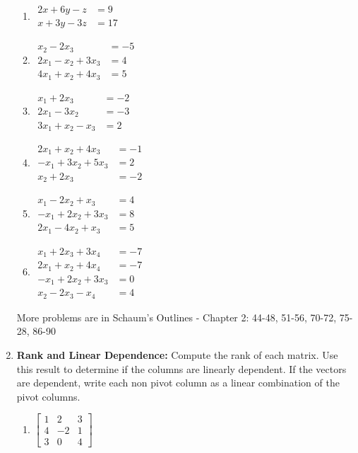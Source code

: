\begin{enumerate}
\begin{multicols}{3}
\begin{enumerate}
	\item 
$
\begin{array}{rl}
 2x+ 6y -z &= 9 \\
 x+ 3y -3z &= 17
\end{array}
$


	\item 
$
\begin{array}{rl}
  x_2 -2x_3 &= -5 \\
 2x_1 -x_2 + 3x_3 &= 4 \\
 4x_1 +x_2 + 4x_3 &= 5
\end{array}
$


	\item 
$
\begin{array}{rl}
 x_1 + 2x_3 &= -2 \\
 2x_1  -3x_2  &= -3 \\
 3x_1 +x_2 -x_3 &= 2
\end{array}
$


	\item 
$
\begin{array}{rl}
 2x_1 +x_2 + 4x_3 &= -1 \\
 -x_1 + 3x_2 + 5x_3 &= 2 \\
 x_2 + 2x_3 &= -2
\end{array}
$


	\item 
$
\begin{array}{rl}
 x_1 -2x_2 +x_3 &= 4 \\
 -x_1 + 2x_2 + 3x_3 &= 8 \\
 2x_1  -4x_2 +x_3 &= 5
\end{array}
$


	\item 
$
\begin{array}{rl}
 x_1 + 2x_3 + 3x_4 &= -7 \\
 2x_1 +x_2 + 4x_4 &= -7 \\
 -x_1 + 2x_2 + 3x_3  &= 0 \\
 x_2  -2x_3  -x_4 &= 4
\end{array}
$
\end{enumerate}
\end{multicols}

More problems are in Schaum's Outlines - 
Chapter 2:
44-48, 51-56, 70-72, 75-28, 86-90 






\item \textbf{Rank and Linear Dependence:} Compute the rank of each matrix. Use this result to determine if the columns are linearly dependent. If the vectors are dependent, write each non pivot column as a linear combination of the pivot columns.
\begin{multicols}{4}
\begin{enumerate}
	\item \label{rank1} 
$
\begin{bmatrix}
 1 & 2 & 3 \\
 4 & -2 & 1 \\
 3 & 0 & 4
\end{bmatrix}
$


\end{enumerate}
\end{multicols}
\end{enumerate}
